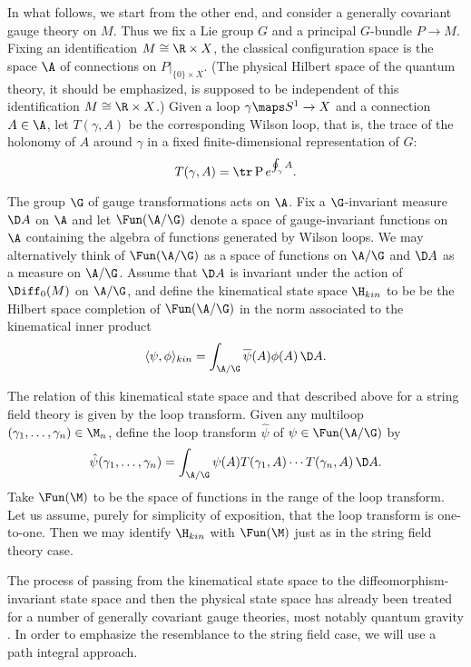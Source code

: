 In what follows, we start from the other end, and
consider a generally covariant gauge theory on $M$.
Thus we fix a Lie group $G$ and a principal $G$-bundle $P \to M$.
Fixing an identification $M \cong \R \times X$, the
classical configuration space is the space $\A$ of
connections on $P|_{\{0\} \times X}$.  (The physical Hilbert space of
the quantum theory, it should be emphasized, is supposed to be
independent of this identification $M \cong \R \times X$.)
Given a loop $\gamma \maps S^1 \to X$ and a connection $A\in \A$,
let $T(\gamma,A)$ be the corresponding Wilson loop, that is,
the trace of the holonomy of $A$ around $\gamma$ in a fixed
finite-dimensional representation of $G$:
\[           T(\gamma,A) = \tr\, {\rm P}\, e^{ \oint_\gamma A } . \]

The group $\G$ of gauge transformations acts on $\A$. Fix a
$\G$-invariant measure $\D A$
on $\A$ and let $\Fun(\A/\G)$ denote a space of gauge-invariant
functions on $\A$
containing the algebra of functions generated by Wilson loops.   We may
alternatively think of $\Fun(\A/\G)$ as a space of
functions on $\A/\G$ and $\D A$ as a measure on $\A/\G$.
Assume that $\D A$ is invariant under the action of
$\Diff_0(M)$ on $\A/\G$, and define the kinematical state space $\H_{kin}$
to be be the Hilbert space completion of $\Fun(\A/\G)$ in the norm
associated to the kinematical inner product
\[ \langle \psi,\phi\rangle_{kin} = \int_{\A/\G}
\overline\psi(A) \phi(A) \, \D A  .\]

The relation of this kinematical state space and that described above
for a string field theory is given by the loop transform.
Given any multiloop $(\gamma_1, \dots, \gamma_n) \in \M_n$, define the loop
transform $\hat\psi$ of $\psi\in \Fun(\A/\G)$ by
\[            \hat\psi(\gamma_1, \dots, \gamma_n) =
\int_{\A/\G} \psi(A) T(\gamma_1,A) \cdots T(\gamma_n,A) \, \D A  .\]
Take $\Fun(\M)$ to be the space of functions in the range of the loop
transform.  Let us assume, purely for simplicity of exposition, that the
loop transform is one-to-one.  Then we may identify $\H_{kin}$ with
$\Fun(\M)$ just as in the string field theory case.

The process of passing from the kinematical state space to the
diffeomorphism-invariant state space and then the physical state space
has already been treated for a number of generally covariant gauge
theories, most notably quantum gravity \cite{A,Rovelli,RS}.
In order to emphasize the resemblance to the
string field case, we will use a path integral approach.

